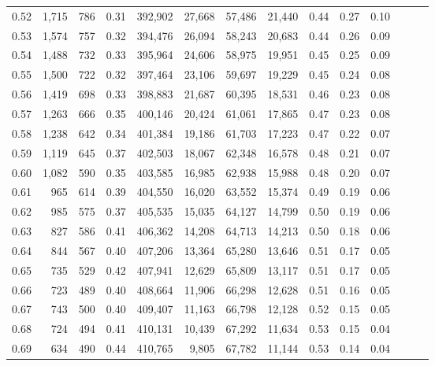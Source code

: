 \begin{tabular}{rrrrrrrrrrrrrr}
0.52 &   1,715 &    786 &  0.31 &  392,902 &   27,668 &  57,486 &  21,440 &  0.44 &  0.27 &      0.10 \\
0.53 &   1,574 &    757 &  0.32 &  394,476 &   26,094 &  58,243 &  20,683 &  0.44 &  0.26 &      0.09 \\
0.54 &   1,488 &    732 &  0.33 &  395,964 &   24,606 &  58,975 &  19,951 &  0.45 &  0.25 &      0.09 \\
0.55 &   1,500 &    722 &  0.32 &  397,464 &   23,106 &  59,697 &  19,229 &  0.45 &  0.24 &      0.08 \\
0.56 &   1,419 &    698 &  0.33 &  398,883 &   21,687 &  60,395 &  18,531 &  0.46 &  0.23 &      0.08 \\
0.57 &   1,263 &    666 &  0.35 &  400,146 &   20,424 &  61,061 &  17,865 &  0.47 &  0.23 &      0.08 \\
0.58 &   1,238 &    642 &  0.34 &  401,384 &   19,186 &  61,703 &  17,223 &  0.47 &  0.22 &      0.07 \\
0.59 &   1,119 &    645 &  0.37 &  402,503 &   18,067 &  62,348 &  16,578 &  0.48 &  0.21 &      0.07 \\
0.60 &   1,082 &    590 &  0.35 &  403,585 &   16,985 &  62,938 &  15,988 &  0.48 &  0.20 &      0.07 \\
0.61 &     965 &    614 &  0.39 &  404,550 &   16,020 &  63,552 &  15,374 &  0.49 &  0.19 &      0.06 \\
0.62 &     985 &    575 &  0.37 &  405,535 &   15,035 &  64,127 &  14,799 &  0.50 &  0.19 &      0.06 \\
0.63 &     827 &    586 &  0.41 &  406,362 &   14,208 &  64,713 &  14,213 &  0.50 &  0.18 &      0.06 \\
0.64 &     844 &    567 &  0.40 &  407,206 &   13,364 &  65,280 &  13,646 &  0.51 &  0.17 &      0.05 \\
0.65 &     735 &    529 &  0.42 &  407,941 &   12,629 &  65,809 &  13,117 &  0.51 &  0.17 &      0.05 \\
0.66 &     723 &    489 &  0.40 &  408,664 &   11,906 &  66,298 &  12,628 &  0.51 &  0.16 &      0.05 \\
0.67 &     743 &    500 &  0.40 &  409,407 &   11,163 &  66,798 &  12,128 &  0.52 &  0.15 &      0.05 \\
0.68 &     724 &    494 &  0.41 &  410,131 &   10,439 &  67,292 &  11,634 &  0.53 &  0.15 &      0.04 \\
0.69 &     634 &    490 &  0.44 &  410,765 &    9,805 &  67,782 &  11,144 &  0.53 &  0.14 &      0.04 \\

\end{tabular}
